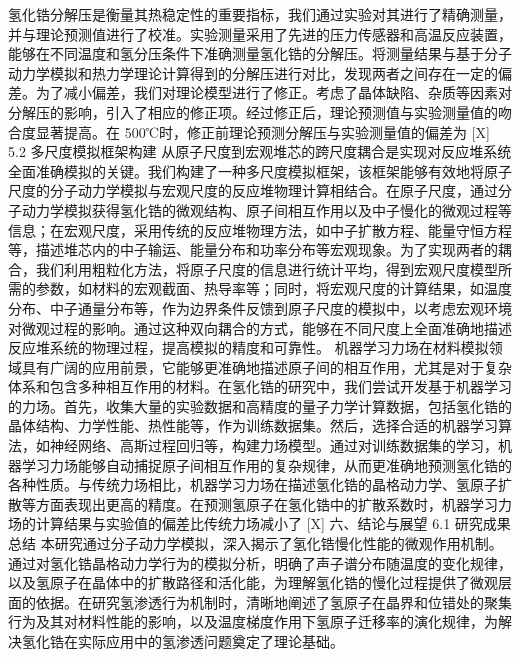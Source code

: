 氢化锆分解压是衡量其热稳定性的重要指标，我们通过实验对其进行了精确测量，并与理论预测值进行了校准。实验测量采用了先进的压力传感器和高温反应装置，能够在不同温度和氢分压条件下准确测量氢化锆的分解压。将测量结果与基于分子动力学模拟和热力学理论计算得到的分解压进行对比，发现两者之间存在一定的偏差。为了减小偏差，我们对理论模型进行了修正。考虑了晶体缺陷、杂质等因素对分解压的影响，引入了相应的修正项。经过修正后，理论预测值与实验测量值的吻合度显著提高。在 500℃时，修正前理论预测分解压与实验测量值的偏差为 [X]%
5.2 多尺度模拟框架构建
从原子尺度到宏观堆芯的跨尺度耦合是实现对反应堆系统全面准确模拟的关键。我们构建了一种多尺度模拟框架，该框架能够有效地将原子尺度的分子动力学模拟与宏观尺度的反应堆物理计算相结合。在原子尺度，通过分子动力学模拟获得氢化锆的微观结构、原子间相互作用以及中子慢化的微观过程等信息；在宏观尺度，采用传统的反应堆物理方法，如中子扩散方程、能量守恒方程等，描述堆芯内的中子输运、能量分布和功率分布等宏观现象。为了实现两者的耦合，我们利用粗粒化方法，将原子尺度的信息进行统计平均，得到宏观尺度模型所需的参数，如材料的宏观截面、热导率等；同时，将宏观尺度的计算结果，如温度分布、中子通量分布等，作为边界条件反馈到原子尺度的模拟中，以考虑宏观环境对微观过程的影响。通过这种双向耦合的方式，能够在不同尺度上全面准确地描述反应堆系统的物理过程，提高模拟的精度和可靠性。
机器学习力场在材料模拟领域具有广阔的应用前景，它能够更准确地描述原子间的相互作用，尤其是对于复杂体系和包含多种相互作用的材料。在氢化锆的研究中，我们尝试开发基于机器学习的力场。首先，收集大量的实验数据和高精度的量子力学计算数据，包括氢化锆的晶体结构、力学性能、热性能等，作为训练数据集。然后，选择合适的机器学习算法，如神经网络、高斯过程回归等，构建力场模型。通过对训练数据集的学习，机器学习力场能够自动捕捉原子间相互作用的复杂规律，从而更准确地预测氢化锆的各种性质。与传统力场相比，机器学习力场在描述氢化锆的晶格动力学、氢原子扩散等方面表现出更高的精度。在预测氢原子在氢化锆中的扩散系数时，机器学习力场的计算结果与实验值的偏差比传统力场减小了 [X]%
六、结论与展望
6.1 研究成果总结
本研究通过分子动力学模拟，深入揭示了氢化锆慢化性能的微观作用机制。通过对氢化锆晶格动力学行为的模拟分析，明确了声子谱分布随温度的变化规律，以及氢原子在晶体中的扩散路径和活化能，为理解氢化锆的慢化过程提供了微观层面的依据。在研究氢渗透行为机制时，清晰地阐述了氢原子在晶界和位错处的聚集行为及其对材料性能的影响，以及温度梯度作用下氢原子迁移率的演化规律，为解决氢化锆在实际应用中的氢渗透问题奠定了理论基础。
